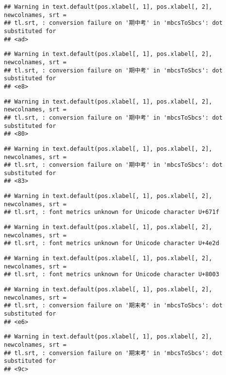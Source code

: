 \documentclass[
]{book}
\begin{document}
\begin{verbatim}
## Warning in text.default(pos.xlabel[, 1], pos.xlabel[, 2], newcolnames, srt =
## tl.srt, : conversion failure on '期中考' in 'mbcsToSbcs': dot substituted for
## <ad>
\end{verbatim}

\begin{verbatim}
## Warning in text.default(pos.xlabel[, 1], pos.xlabel[, 2], newcolnames, srt =
## tl.srt, : conversion failure on '期中考' in 'mbcsToSbcs': dot substituted for
## <e8>
\end{verbatim}

\begin{verbatim}
## Warning in text.default(pos.xlabel[, 1], pos.xlabel[, 2], newcolnames, srt =
## tl.srt, : conversion failure on '期中考' in 'mbcsToSbcs': dot substituted for
## <80>
\end{verbatim}

\begin{verbatim}
## Warning in text.default(pos.xlabel[, 1], pos.xlabel[, 2], newcolnames, srt =
## tl.srt, : conversion failure on '期中考' in 'mbcsToSbcs': dot substituted for
## <83>
\end{verbatim}

\begin{verbatim}
## Warning in text.default(pos.xlabel[, 1], pos.xlabel[, 2], newcolnames, srt =
## tl.srt, : font metrics unknown for Unicode character U+671f
\end{verbatim}

\begin{verbatim}
## Warning in text.default(pos.xlabel[, 1], pos.xlabel[, 2], newcolnames, srt =
## tl.srt, : font metrics unknown for Unicode character U+4e2d
\end{verbatim}

\begin{verbatim}
## Warning in text.default(pos.xlabel[, 1], pos.xlabel[, 2], newcolnames, srt =
## tl.srt, : font metrics unknown for Unicode character U+8003
\end{verbatim}

\begin{verbatim}
## Warning in text.default(pos.xlabel[, 1], pos.xlabel[, 2], newcolnames, srt =
## tl.srt, : conversion failure on '期末考' in 'mbcsToSbcs': dot substituted for
## <e6>
\end{verbatim}

\begin{verbatim}
## Warning in text.default(pos.xlabel[, 1], pos.xlabel[, 2], newcolnames, srt =
## tl.srt, : conversion failure on '期末考' in 'mbcsToSbcs': dot substituted for
## <9c>
\end{verbatim}
\end{document}
